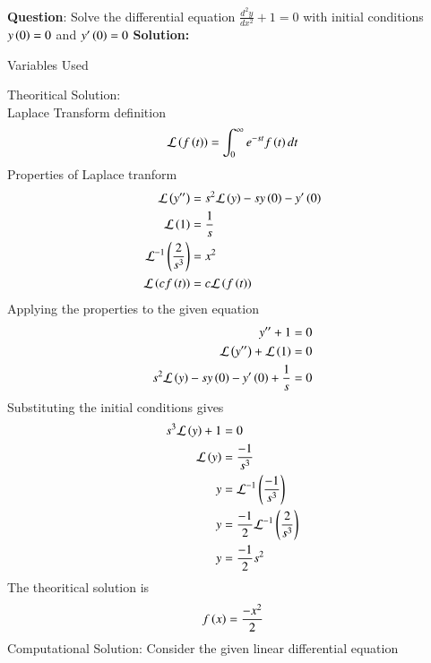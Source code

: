 \documentclass[journal]{IEEEtran}
\begin{document}
\textbf{Question}:\newline
Solve the differential equation $\frac{d^2y}{dx^2} + 1 = 0$ with initial conditions $y\left(0\right) = 0$ and $y^{\prime}\left(0\right) = 0$
\newline
\textbf{Solution: }
\begin{table}[h!]    
  \centering
  
  \caption{Variables Used}
  \label{tab1.1.2.2}
\end{table}
\newline
Theoritical Solution:\\
Laplace Transform definition\\
\begin{align}
	\mathcal{L}\left(f\left(t\right)\right) = \int_{0}^{\infty}e^{-st}f\left(t\right)dt
\end{align}
Properties of Laplace tranform
\begin{align}
	\mathcal{L}\left(y^{\prime\prime}\right) &= s^2\mathcal{L}\left(y\right) -sy\left(0\right)-y^\prime\left(0\right)\\
	\mathcal{L}\left(1\right) &= \frac{1}{s}\\
	\mathcal{L}^{-1}\left(\frac{2}{s^3}\right) &= x^2\\
	\mathcal{L}\left(cf\left(t\right)\right) &= c\mathcal{L}\left(f\left(t\right)\right)
\end{align}
Applying the properties to the given equation
\begin{align}
	y^{\prime\prime} + 1 &= 0\\
	\mathcal{L}\left(y^{\prime\prime}\right) + \mathcal{L}\left(1\right) &= 0\\
	s^2\mathcal{L}\left(y\right) -sy\left(0\right)-y^\prime\left(0\right)+\frac{1}{s} &= 0\\
\end{align}
Substituting the initial conditions gives
\begin{align}
	s^3\mathcal{L}\left(y\right) + 1 &= 0\\
	\mathcal{L}\left(y\right) &= \frac{-1}{s^3}\\
	y &= \mathcal{L}^{-1}\left(\frac{-1}{s^3}\right)\\
	y &= \frac{-1}{2}\mathcal{L}^{-1}\left(\frac{2}{s^3}\right)\\
	y &= \frac{-1}{2}s^2
\end{align}
The theoritical solution is 
\begin{align}
	f\left(x\right) = \frac{-x^2}{2}
\end{align}
\newline
Computational Solution:\newline
Consider the given linear differential equation
\end{document}
